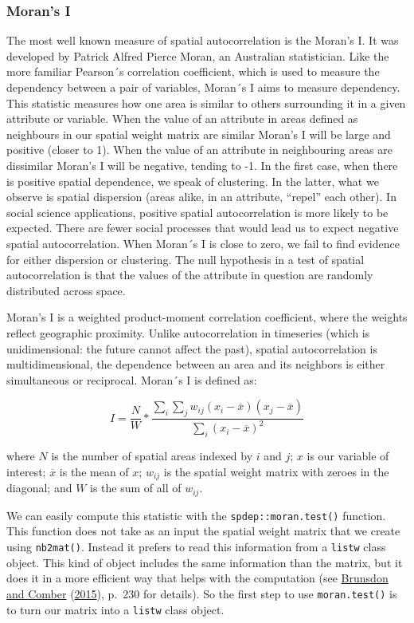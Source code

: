 \documentclass[
  krantz2]{krantz}
\begin{document}
\hypertarget{morans-i}{%
\subsubsection{Moran's I}\label{morans-i}}

The most well known measure of spatial autocorrelation is the Moran's I. It was developed by Patrick Alfred Pierce Moran, an Australian statistician. Like the more familiar Pearson´s correlation coefficient, which is used to measure the dependency between a pair of variables, Moran´s I aims to measure dependency. This statistic measures how one area is similar to others surrounding it in a given attribute or variable. When the value of an attribute in areas defined as neighbours in our spatial weight matrix are similar Moran's I will be large and positive (closer to 1). When the value of an attribute in neighbouring areas are dissimilar Moran's I will be negative, tending to -1. In the first case, when there is positive spatial dependence, we speak of clustering. In the latter, what we observe is spatial dispersion (areas alike, in an attribute, ``repel'' each other). In social science applications, positive spatial autocorrelation is more likely to be expected. There are fewer social processes that would lead us to expect negative spatial autocorrelation. When Moran´s I is close to zero, we fail to find evidence for either dispersion or clustering. The null hypothesis in a test of spatial autocorrelation is that the values of the attribute in question are randomly distributed across space.

Moran's I is a weighted product-moment correlation coefficient, where the weights reflect geographic proximity. Unlike autocorrelation in timeseries (which is unidimensional: the future cannot affect the past), spatial autocorrelation is multidimensional, the dependence between an area and its neighbors is either simultaneous or reciprocal. Moran´s I is defined as:

\[I = \frac{N}{W}* \frac{\sum_{i} \sum_{j} w_{ij}   (x_{i}-\overline{x})(x_{j}-\overline{x})}{\sum_{i}(x_{i}-\overline{x})^2}\]

where \(N\) is the number of spatial areas indexed by \(i\) and \(j\); \(x\) is our variable of interest; \(\overline{x}\) is the mean of \(x\); \(w_{ij}\) is the spatial weight matrix with zeroes in the diagonal; and \(W\) is the sum of all of \(w_{ij}\).

We can easily compute this statistic with the \texttt{spdep::moran.test()} function. This function does not take as an input the spatial weight matrix that we create using \texttt{nb2mat()}. Instead it prefers to read this information from a \texttt{listw} class object. This kind of object includes the same information than the matrix, but it does it in a more efficient way that helps with the computation (see \protect\hyperlink{ref-Brunsdon_2015}{Brunsdon and Comber} (\protect\hyperlink{ref-Brunsdon_2015}{2015}), p.~230 for details). So the first step to use \texttt{moran.test()} is to turn our matrix into a \texttt{listw} class object.
\end{document}
